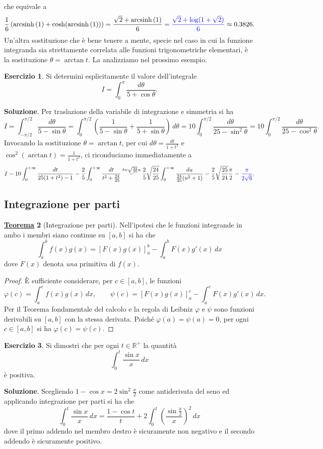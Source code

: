 \documentclass[a4paper,twoside]{article}
\newcommand{\R}{\mathbb{R}}
\newcommand{\arcsinh}[1]{\operatorname{arcsinh}\left(#1\right)}
\theoremstyle{definition}
\newtheorem{theorem}{\color{Red}\underline{\textrm Teorema}}
\newtheorem{ex}[theorem]{Esercizio}
\numberwithin{theorem}{section}
\begin{document}
che equivale a 
$$ \frac{1}{6}\left(\arcsinh{1}+\cosh(\arcsinh{1})\right) = \frac{\sqrt{2}+\arcsinh{1}}{6}={\color{blue}\frac{\sqrt{2}+\log(1+\sqrt{2})}{6}}\approx 0.3826. $$
Un'altra sostituzione che è bene tenere a mente, specie nel caso in cui la funzione integranda sia strettamente correlata alle funzioni trigonometriche elementari, è la sostituzione $\theta=\arctan t$. La analizziamo nel prossimo esempio.
\begin{ex} Si determini esplicitamente il valore dell'integrale 
$$ I = \int_{0}^{\pi}\frac{d\theta}{5+\cos\theta}.$$
\end{ex}
\textbf{Soluzione}. Per traslazione della variabile di integrazione e simmetria si ha 
$$ I = \int_{-\pi/2}^{\pi/2}\frac{d\theta}{5-\sin\theta} = \int_{0}^{\pi/2}\left(\frac{1}{5-\sin\theta}+\frac{1}{5+\sin\theta}\right)\,d\theta = 10\int_{0}^{\pi/2}\frac{d\theta}{25-\sin^2\theta}=10\int_{0}^{\pi/2}\frac{d\theta}{25-\cos^2\theta}. $$
Invocando la sostituzione $\theta=\arctan t$, per cui $d\theta=\frac{dt}{1+t^2}$ e $\cos^2(\arctan t)=\frac{1}{1+t^2}$, ci riconduciamo immediatamente a
$$ I = 10\int_{0}^{+\infty}\frac{dt}{25(1+t^2)-1}=\frac{2}{5}\int_{0}^{+\infty}\frac{dt}{t^2+\frac{24}{25}}\stackrel{t=\sqrt{\frac{24}{25}}u}{=}\frac{2}{5}\sqrt{\frac{24}{25}}\int_{0}^{+\infty}\frac{du}{\frac{24}{25}(u^2+1)}=\frac{2}{5}\sqrt{\frac{25}{24}}\frac{\pi}{2} = {\color{blue}\frac{\pi}{2\sqrt{6}}}. $$


\subsection{Integrazione per parti}
\begin{theorem}[Integrazione per parti]
Nell'ipotesi che le funzioni integrande in ambo i membri siano continue su $[a,b]$ si ha che 
$$ \int_{a}^{b} f(x)g(x) = \left[ F(x)g(x)\right]_{a}^{b}-\int_{a}^{b} F(x)g'(x)\,dx $$
dove $F(x)$ denota \emph{una} primitiva di $f(x)$.
\end{theorem}
\begin{proof} È sufficiente considerare, per $c\in[a,b]$, le funzioni 
$$ \varphi(c) = \int_{a}^{c}f(x)g(x)\,dx,\qquad \psi(c)=[F(x)g(x)]_{a}^{c}-\int_{a}^{c}F(x)g'(x)\,dx.$$
Per il Teorema fondamentale del calcolo e la regola di Leibniz $\varphi$ e $\psi$ sono funzioni derivabili su $[a,b]$ con la stessa derivata. Poiché $\varphi(a)=\psi(a)=0$, per ogni $c\in[a,b]$ si ha $\varphi(c)=\psi(c)$. 
\end{proof}

\begin{ex} Si dimostri che per ogni $t\in\R^+$ la quantità 
$$ \int_{0}^{t}\frac{\sin x}{x}\,dx $$
è positiva. 
\end{ex}
\textbf{Soluzione}. Scegliendo $1-\cos x = 2\sin^2\frac{x}{2}$ come antiderivata del seno ed applicando integrazione per parti si ha che 
$$ \int_{0}^{t}\frac{\sin x}{x}\,dx = \frac{1-\cos t}{t}+2\int_{0}^{t}\left(\frac{\sin\frac{x}{2}}{x}\right)^2\,dx $$
dove il primo addendo nel membro destro è sicuramente non negativo e il secondo addendo è sicuramente positivo.
\end{document}
